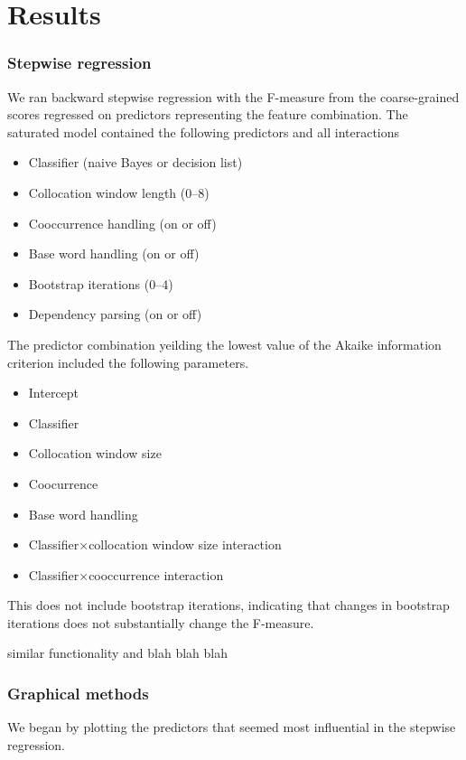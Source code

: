 \documentclass{article}
\begin{document}
\section{Results}

\subsubsection{Stepwise regression}
We ran backward stepwise regression with the F-measure from the coarse-grained scores
regressed on predictors representing the feature combination.
The saturated model contained the following predictors and all interactions
\begin{itemize}
\item Classifier (naive Bayes or decision list)
\item Collocation window length (0--8)
\item Cooccurrence handling (on or off)
\item Base word handling (on or off)
\item Bootstrap iterations (0--4)
\item Dependency parsing (on or off)
\end{itemize}
The predictor combination yeilding the lowest value of the Akaike information criterion
included the following parameters.
\begin{itemize}
\item Intercept
\item Classifier
\item Collocation window size
\item Coocurrence
\item Base word handling
\item Classifier$\times$collocation window size interaction
\item Classifier$\times$cooccurrence interaction
\end{itemize}
This does not include bootstrap iterations, indicating that changes
in bootstrap iterations does not substantially change the F-measure.




similar functionality and blah blah blah

\subsubsection{Graphical methods}
We began by plotting the predictors that seemed most influential in the
stepwise regression.
\end{document}
